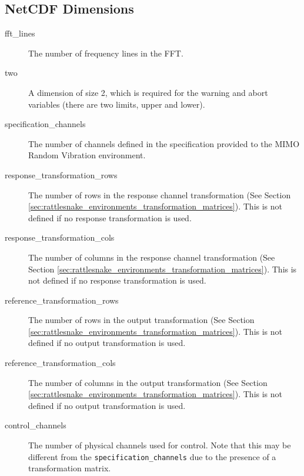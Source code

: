 \documentclass[pdf,12pt,report]{SANDreport}
\newcommand{\inlineCode}{\lstinline[basicstyle=\bfseries\ttfamily]}
\begin{document}
    \subsection{NetCDF Dimensions}
    \begin{description}
        \item[fft\_lines] The number of frequency lines in the \ac{FFT}.
        \item[two] A dimension of size 2, which is required for the warning and abort variables (there are two limits, upper and lower).
        \item[specification\_channels] The number of channels defined in the specification provided to the \Ac{MIMO} Random Vibration environment.
        \item[response\_transformation\_rows] The number of rows in the response channel transformation (See Section \ref{sec:rattlesnake_environments_transformation_matrices}).  This is not defined if no response transformation is used.
        \item[response\_transformation\_cols] The number of columns in the response channel transformation (See Section \ref{sec:rattlesnake_environments_transformation_matrices}).  This is not defined if no response transformation is used.
        \item[reference\_transformation\_rows] The number of rows in the output transformation (See Section \ref{sec:rattlesnake_environments_transformation_matrices}).  This is not defined if no output transformation is used.
        \item[reference\_transformation\_cols] The number of columns in the output transformation (See Section \ref{sec:rattlesnake_environments_transformation_matrices}).  This is not defined if no output transformation is used.
        \item[control\_channels] The number of physical channels used for control.  Note that this may be different from the \inlineCode{specification_channels} due to the presence of a transformation matrix.
    \end{description}
    
\end{document}
